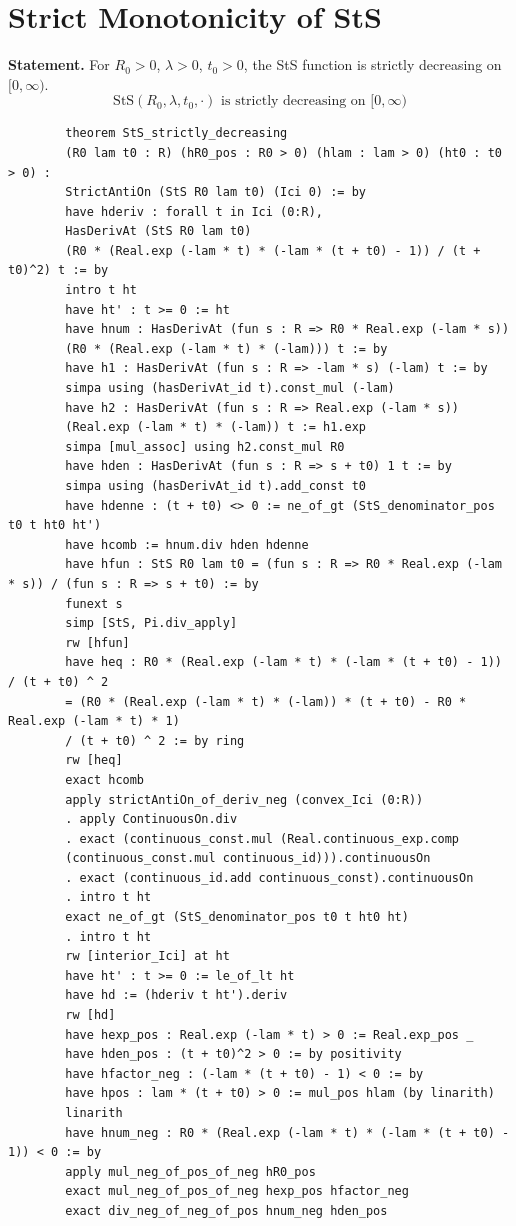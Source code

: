 \documentclass[11pt,a4paper]{article}
\begin{document}
	\section{Strict Monotonicity of StS}
	
	\textbf{Statement.} For $R_0 > 0$, $\lambda > 0$, $t_0 > 0$, the StS function is strictly decreasing on $[0, \infty)$.
	\begin{equation}
		\text{StS}(R_0, \lambda, t_0, \cdot) \text{ is strictly decreasing on } [0,\infty)
	\end{equation}
	
	\begin{lstlisting}
		theorem StS_strictly_decreasing
		(R0 lam t0 : R) (hR0_pos : R0 > 0) (hlam : lam > 0) (ht0 : t0 > 0) :
		StrictAntiOn (StS R0 lam t0) (Ici 0) := by
		have hderiv : forall t in Ici (0:R),
		HasDerivAt (StS R0 lam t0)
		(R0 * (Real.exp (-lam * t) * (-lam * (t + t0) - 1)) / (t + t0)^2) t := by
		intro t ht
		have ht' : t >= 0 := ht
		have hnum : HasDerivAt (fun s : R => R0 * Real.exp (-lam * s))
		(R0 * (Real.exp (-lam * t) * (-lam))) t := by
		have h1 : HasDerivAt (fun s : R => -lam * s) (-lam) t := by
		simpa using (hasDerivAt_id t).const_mul (-lam)
		have h2 : HasDerivAt (fun s : R => Real.exp (-lam * s))
		(Real.exp (-lam * t) * (-lam)) t := h1.exp
		simpa [mul_assoc] using h2.const_mul R0
		have hden : HasDerivAt (fun s : R => s + t0) 1 t := by
		simpa using (hasDerivAt_id t).add_const t0
		have hdenne : (t + t0) <> 0 := ne_of_gt (StS_denominator_pos t0 t ht0 ht')
		have hcomb := hnum.div hden hdenne
		have hfun : StS R0 lam t0 = (fun s : R => R0 * Real.exp (-lam * s)) / (fun s : R => s + t0) := by
		funext s
		simp [StS, Pi.div_apply]
		rw [hfun]
		have heq : R0 * (Real.exp (-lam * t) * (-lam * (t + t0) - 1)) / (t + t0) ^ 2
		= (R0 * (Real.exp (-lam * t) * (-lam)) * (t + t0) - R0 * Real.exp (-lam * t) * 1)
		/ (t + t0) ^ 2 := by ring
		rw [heq]
		exact hcomb
		apply strictAntiOn_of_deriv_neg (convex_Ici (0:R))
		. apply ContinuousOn.div
		. exact (continuous_const.mul (Real.continuous_exp.comp
		(continuous_const.mul continuous_id))).continuousOn
		. exact (continuous_id.add continuous_const).continuousOn
		. intro t ht
		exact ne_of_gt (StS_denominator_pos t0 t ht0 ht)
		. intro t ht
		rw [interior_Ici] at ht
		have ht' : t >= 0 := le_of_lt ht
		have hd := (hderiv t ht').deriv
		rw [hd]
		have hexp_pos : Real.exp (-lam * t) > 0 := Real.exp_pos _
		have hden_pos : (t + t0)^2 > 0 := by positivity
		have hfactor_neg : (-lam * (t + t0) - 1) < 0 := by
		have hpos : lam * (t + t0) > 0 := mul_pos hlam (by linarith)
		linarith
		have hnum_neg : R0 * (Real.exp (-lam * t) * (-lam * (t + t0) - 1)) < 0 := by
		apply mul_neg_of_pos_of_neg hR0_pos
		exact mul_neg_of_pos_of_neg hexp_pos hfactor_neg
		exact div_neg_of_neg_of_pos hnum_neg hden_pos
	\end{lstlisting}
	
\end{document}
